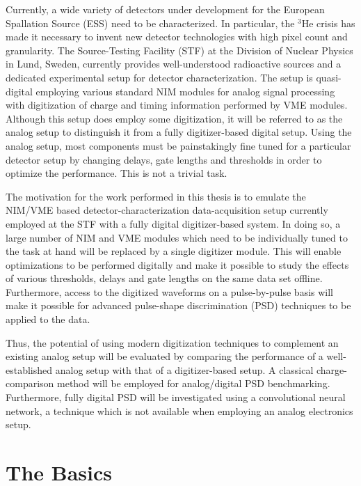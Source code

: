 \documentclass[main.tex]{subfiles}
\begin{document}
Currently, a wide variety of detectors under development for the European Spallation Source (ESS) need to be characterized. In particular, the $^\textrm{3}$He crisis has made it necessary to invent new detector technologies with high pixel count and granularity. The Source-Testing Facility (STF) at the Division of Nuclear Physics in Lund, Sweden, currently provides well-understood radioactive sources and a dedicated experimental setup for detector characterization. 
The setup is quasi-digital employing various standard NIM modules for analog signal processing with digitization of charge and timing information performed by VME modules. Although this setup does employ some digitization, it will be referred to as the analog setup to distinguish it from a fully digitizer-based digital setup. Using the analog setup, most components must be painstakingly fine tuned for a particular detector setup by changing delays, gate lengths and thresholds in order to optimize the performance. This is not a trivial task. 

The motivation for the work performed in this thesis is to emulate the NIM/VME based detector-characterization data-acquisition setup currently employed at the STF with a fully digital digitizer-based  system. In doing so, a large number of NIM and VME modules which need to be individually tuned to the task at hand will be replaced by a single digitizer module. 
This will enable optimizations to be performed digitally and make it possible to study the effects of various thresholds, delays and gate lengths on the same data set offline. Furthermore, access to the digitized waveforms on a pulse-by-pulse basis will make it possible for advanced pulse-shape discrimination (PSD) techniques to be applied to the data.

Thus, the potential of using modern digitization techniques to complement an existing analog setup will be evaluated by comparing the performance of a well-established analog setup with that of a digitizer-based setup. A classical charge-comparison method will be employed for analog/digital PSD benchmarking. Furthermore, fully digital PSD will be investigated using a convolutional neural network, a technique which is not available when employing an analog electronics setup.

\section{The Basics}
\end{document}
